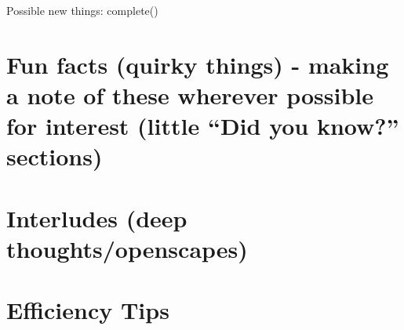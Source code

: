 \documentclass[]{book}
\begin{document}
Possible new things:
complete()

\hypertarget{fun-facts-quirky-things---making-a-note-of-these-wherever-possible-for-interest-little-did-you-know-sections}{%
\section{Fun facts (quirky things) - making a note of these wherever possible for interest (little ``Did you know?'' sections)}\label{fun-facts-quirky-things---making-a-note-of-these-wherever-possible-for-interest-little-did-you-know-sections}}

\hypertarget{interludes-deep-thoughtsopenscapes-1}{%
\section{Interludes (deep thoughts/openscapes)}\label{interludes-deep-thoughtsopenscapes-1}}

\hypertarget{efficiency-tips-5}{%
\section{Efficiency Tips}\label{efficiency-tips-5}}


\end{document}
